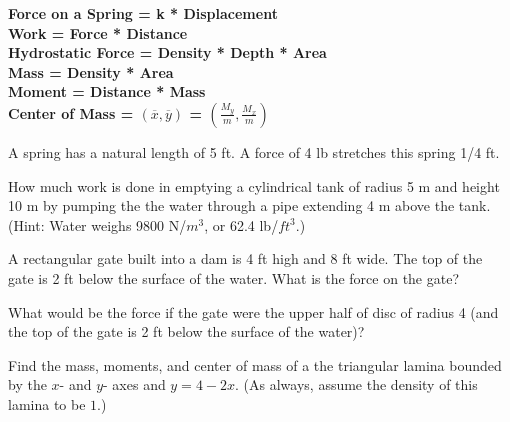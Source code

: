 \documentclass[12pt]{exam}
\begin{document}
\textbf{\hspace{-.3in}
Force on a Spring = k * Displacement\\
Work = Force * Distance \\
Hydrostatic Force = Density * Depth * Area\\
Mass = Density * Area\\
Moment = Distance * Mass\\
Center of Mass = $(\overline{x},\overline{y})$ = $\left(\frac{M_y}{m},
\frac{M_x}{m}\right)$
}

\begin{questions}

\question A spring has a natural length of 5 ft.  A force of
4 lb stretches this spring 1/4 ft.  

\question How much work is done in emptying a cylindrical tank of 
radius 5 m and height 10 m by pumping the the water through a 
pipe extending 4 m above the tank.  (Hint: Water weighs 9800 N/$m^3$, or
62.4 lb/$ft^3$.)


\question A rectangular gate built into a dam is 4 ft high and 8 ft wide.
The top of the gate is 2 ft below the surface of the water.  What is the 
force on the gate?

\question What would be  the force if the gate were the upper half of disc of
radius 4 (and the top of the gate is 2 ft below the surface of the water)?

\question Find the mass, moments, and center of mass of a the
triangular lamina bounded by the $x$- and $y$- axes and $y=4-2x$.
(As always, assume the density of this lamina to be $1$.)










\end{questions}
\end{document}

